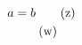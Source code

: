 \documentclass{article}
\begin{document}
\begin{align}
a &= b \tag{z}\notag \\
&\tag{w}\notag
\end{align}
\end{document}
